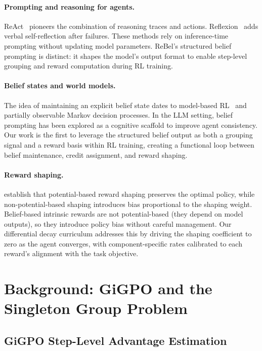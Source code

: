 \documentclass{article}
\begin{document}
\paragraph{Prompting and reasoning for agents.}
ReAct~\citep{yao2023react} pioneers the combination of reasoning traces and actions.
Reflexion~\citep{shinn2024reflexion} adds verbal self-reflection after failures.
These methods rely on inference-time prompting without updating model parameters.
ReBel's structured belief prompting is distinct: it shapes the model's output
format to enable step-level grouping and reward computation during RL training.

\paragraph{Belief states and world models.}
The idea of maintaining an explicit belief state dates to model-based
RL~\citep{dyna1991sutton} and partially observable Markov decision processes.
In the LLM setting, belief prompting has been explored as a cognitive scaffold
to improve agent consistency.
Our work is the first to leverage the structured belief output as both a
grouping signal and a reward basis within RL training, creating a functional
loop between belief maintenance, credit assignment, and reward shaping.

\paragraph{Reward shaping.}
\citet{ng1999policy} establish that potential-based reward shaping preserves
the optimal policy, while non-potential-based shaping introduces bias
proportional to the shaping weight.
Belief-based intrinsic rewards are not potential-based (they depend on model
outputs), so they introduce policy bias without careful management.
Our differential decay curriculum addresses this by driving the shaping
coefficient to zero as the agent converges, with component-specific rates
calibrated to each reward's alignment with the task objective.


\section{Background: GiGPO and the Singleton Group Problem}
\label{sec:motivation}

\subsection{GiGPO Step-Level Advantage Estimation}
\end{document}
